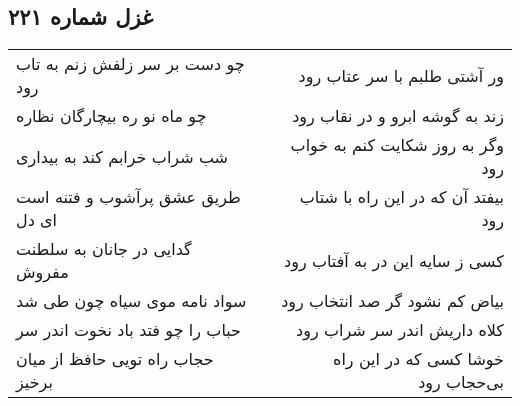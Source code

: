 \begin{center}
\section*{غزل شماره ۲۲۱}
\label{sec:sh221}
\begin{longtable}{l p{0.5cm} r}
چو دست بر سر زلفش زنم به تاب رود
&&
ور آشتی طلبم با سر عتاب رود
\\
چو ماه نو ره بیچارگان نظاره
&&
زند به گوشه ابرو و در نقاب رود
\\
شب شراب خرابم کند به بیداری
&&
وگر به روز شکایت کنم به خواب رود
\\
طریق عشق پرآشوب و فتنه است ای دل
&&
بیفتد آن که در این راه با شتاب رود
\\
گدایی در جانان به سلطنت مفروش
&&
کسی ز سایه این در به آفتاب رود
\\
سواد نامه موی سیاه چون طی شد
&&
بیاض کم نشود گر صد انتخاب رود
\\
حباب را چو فتد باد نخوت اندر سر
&&
کلاه داریش اندر سر شراب رود
\\
حجاب راه تویی حافظ از میان برخیز
&&
خوشا کسی که در این راه بی‌حجاب رود
\\
\end{longtable}
\end{center}
